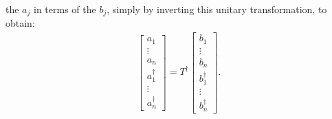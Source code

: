 \documentclass[12pt]{article}
\begin{document}
the $a_j$ in terms of the $b_j$, simply by inverting this unitary
transformation, to obtain:
\begin{eqnarray}
  \left[ \begin{array}{c} a_1 \\ \vdots \\ a_n \\
    a_1^\dagger \\ \vdots \\ a_n^\dagger \end{array} \right]
  = T^\dagger
  \left[ \begin{array}{c} b_1 \\ \vdots \\ b_n \\
    b_1^\dagger \\ \vdots \\ b_n^\dagger \end{array} \right].
\end{eqnarray}
\end{document}
